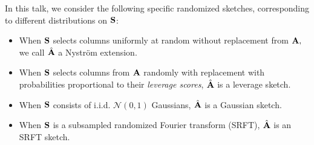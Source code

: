 \documentclass[xcolor=x11names,compress,ignorenonframetext,10pt]{beamer}
\renewcommand{\(}{\begin{columns}}
\renewcommand{\)}{\end{columns}}
\newcommand{\<}[1]{\begin{column}{#1}}
\renewcommand{\>}{\end{column}}
\begin{document}
\begin{frame}

In this talk, we consider the following specific randomized sketches, corresponding to different distributions on $\mathbf{S}$:
 \begin{itemize}
  \item When $\mathbf{S}$ selects columns uniformly at random without replacement from $\mathbf{A},$ 
   we call $\hat{\mathbf{A}}$ a \textcolor{dgreen}{Nystr\"om extension}.
  \item When $\mathbf{S}$ selects columns from $\mathbf{A}$ randomly with replacement with probabilities proportional to their 
   \emph{leverage scores}, $\hat{\mathbf{A}}$ is a \textcolor{dgreen}{leverage sketch}.
  \item When $\mathbf{S}$ consists of i.i.d. $\mathcal{N}(0,1)$ Gaussians, $\hat{\mathbf{A}}$ is a \textcolor{dgreen}{Gaussian sketch}.
  \item When $\mathbf{S}$ is a subsampled randomized Fourier transform (SRFT), $\hat{\mathbf{A}}$ is an \textcolor{dgreen}{SRFT sketch}.
 \end{itemize}

 \end{frame}
\end{document}
